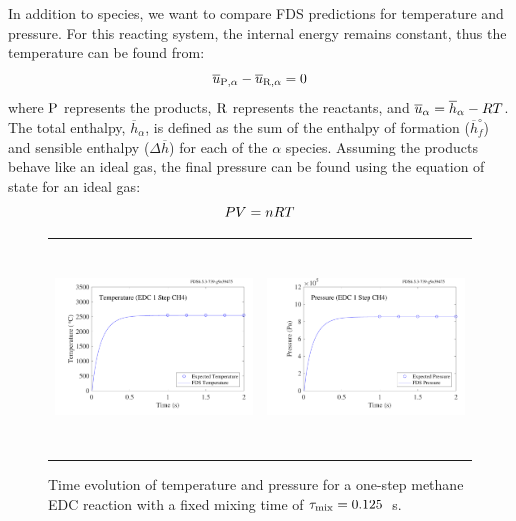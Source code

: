 \documentclass[11pt]{book}
\begin{document}
In addition to species, we want to compare FDS predictions for temperature and pressure. For this reacting system, the internal energy remains constant, thus the temperature can be found from:
\begin{equation}\label{eq:del_u}
\overline{u}_{{\rm P},\alpha} - \overline{u}_{{\rm R},\alpha} = 0
\end{equation}
where ${\rm P}$ represents the products, ${\rm R}$ represents the reactants, and $\overline{u}_{\alpha}=\overline{h}_{\alpha}-R T$. The total enthalpy, $\overline{h}_{\alpha}$, is defined as the sum of the enthalpy of formation ($\overline{h}_{f}^{\circ}$) and sensible enthalpy ($\Delta \overline{h}$) for each of the $\alpha$ species. Assuming the products behave like an ideal gas, the final pressure can be found using the equation of state for an ideal gas:
\begin{equation}\label{eq:ideal_gas}
PV = n R T
\end{equation}
\begin{figure}[!ht]
\begin{tabular*}{\textwidth}{lr}
\includegraphics[height=2.2in]{SCRIPT_FIGURES/reactionrate_EDC_flim_1step_CH4_temp} &
\includegraphics[height=2.2in]{SCRIPT_FIGURES/reactionrate_EDC_flim_1step_CH4_pres}
\end{tabular*}
\caption[Temperature and pressure evolution in a 1-step methane EDC reaction]{Time evolution of temperature and pressure for a one-step methane EDC reaction with a fixed mixing time of $\tau_{\rm mix}=0.125$~s.}
\label{fig:EDC_1Step_meth_temppres}
\end{figure}
\end{document}
